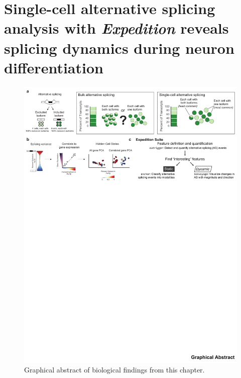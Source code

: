 \chapter{Single-cell alternative splicing analysis with \emph{Expedition} reveals splicing dynamics during neuron differentiation}


\begin{figure}[h]
  \centering
  \includegraphics[width=5.8in]{figures/graphical_abstract.pdf}
  \caption{Graphical abstract of biological findings from this chapter.}
  \label{fig:graphical_abstract}
\end{figure}

